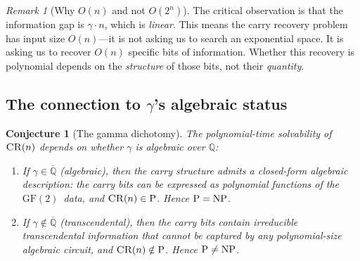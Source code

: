 \documentclass[12pt, a4paper]{article}
\theoremstyle{plain}
\newtheorem{conjecture}[theorem]{Conjecture}
\theoremstyle{definition}
\theoremstyle{remark}
\newtheorem{remark}[theorem]{Remark}
\newcommand{\Q}{\mathbb{Q}}
\newcommand{\GF}{\mathrm{GF}}
\newcommand{\NP}{\textup{NP}}
\newcommand{\PP}{\textup{P}}
\begin{document}
\begin{remark}[Why $O(n)$ and not $O(2^n)$]
The critical observation is that the information gap is
$\gamma \cdot n$, which is \emph{linear}.  This means the carry
recovery problem has input size $O(n)$---it is not asking us to search
an exponential space.  It is asking us to recover $O(n)$ specific bits
of information.  Whether this recovery is polynomial depends on the
\emph{structure} of those bits, not their \emph{quantity}.
\end{remark}

\subsection{The connection to $\gamma$'s algebraic status}

\begin{conjecture}[The gamma dichotomy]\label{conj:dichotomy}
The polynomial-time solvability of $\textsc{CR}(n)$ depends on whether
$\gamma$ is algebraic over $\Q$:
\begin{enumerate}[nosep, label=(\roman*)]
  \item If $\gamma \in \overline{\Q}$ (algebraic), then the carry
        structure admits a closed-form algebraic description: the
        carry bits can be expressed as polynomial functions of the
        $\GF(2)$~data, and $\textsc{CR}(n) \in \PP$.  Hence
        $\PP = \NP$.
  \item If $\gamma \notin \overline{\Q}$ (transcendental), then the
        carry bits contain irreducible transcendental information that
        cannot be captured by any polynomial-size algebraic circuit,
        and $\textsc{CR}(n) \notin \PP$.  Hence $\PP \neq \NP$.
\end{enumerate}
\end{conjecture}
\end{document}
